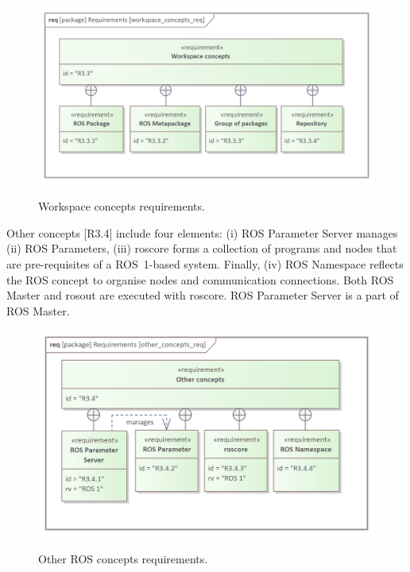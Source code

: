 \documentclass[11pt,oneside,a4paper]{article}
\begin{document}
	\begin{figure}[H]
		\centering
		\begin{center}
			{\includegraphics[scale=1]{img/requirement_pkg/workspace_concepts_req.png}}
		\end{center}
		\caption{Workspace concepts requirements.} 
		\label{fig:workspace_concepts_req}
	\end{figure}
	Other concepts [R3.4] include four elements: (i) ROS Parameter Server manages (ii) ROS Parameters, (iii) roscore forms a collection of programs and nodes that are pre-requisites of a ROS~1-based system. Finally, (iv) ROS Namespace reflects the ROS concept to organise nodes and communication connections. Both ROS Master and rosout are executed with roscore. ROS Parameter Server is a part of ROS Master.
	
	\begin{figure}[H]
			\centering
			\begin{center}
					{\includegraphics[scale=1]{img/requirement_pkg/other_concepts_req.png}}
				\end{center}
			\caption{Other ROS concepts requirements.} 
			\label{fig:other_concepts_req}
		\end{figure}
\end{document}
